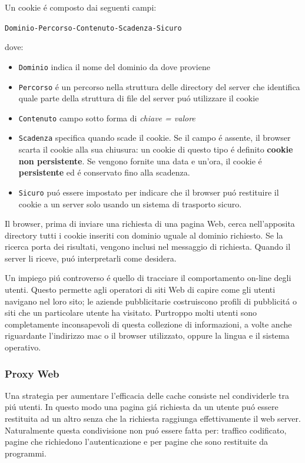 \documentclass[12pt]{article}
\def\code#1{\texttt{#1}}
\begin{document}
Un cookie \'e composto dai seguenti campi:
\begin{center}
	\code{Dominio-Percorso-Contenuto-Scadenza-Sicuro}
\end{center}
dove:
\begin{itemize}[noitemsep]
	\item \code{Dominio} indica il nome del dominio da dove proviene
	\item \code{Percorso} \'e un percorso nella struttura delle directory del server che identifica quale parte della struttura di 
		  file del server pu\'o utilizzare il cookie
	\item \code{Contenuto} campo sotto forma di \textit{chiave = valore}
	\item \code{Scadenza} specifica quando scade il cookie. Se il campo \'e assente, il browser scarta il cookie alla sua 
		  chiusura: un cookie di questo tipo \'e definito \textbf{cookie non persistente}. Se vengono fornite una data e un'ora, il 
		  cookie \'e \textbf{persistente} ed \'e conservato fino alla scadenza.
	\item \code{Sicuro} pu\'o essere impostato per indicare che il browser pu\'o restituire il cookie a un server solo usando un 
	      sistema di trasporto sicuro.
\end{itemize}
Il browser, prima di inviare una richiesta di una pagina Web, cerca nell'apposita directory tutti i cookie inseriti con dominio 
uguale al dominio richiesto. Se la ricerca porta dei risultati, vengono inclusi nel messaggio di richiesta. Quando il server li 
riceve, pu\'o interpretarli come desidera.

Un impiego pi\'u controverso \'e quello di tracciare il comportamento on-line degli utenti. Questo permette agli 
operatori di siti Web di capire come gli utenti navigano nel loro sito; le aziende pubblicitarie costruiscono profili di 
pubblicit\'a o siti che un particolare utente ha visitato. Purtroppo molti utenti sono completamente inconsapevoli di questa 
collezione di informazioni, a volte anche riguardante l'indirizzo mac o il browser utilizzato, oppure la lingua e il sistema 
operativo.

\subsubsection{Proxy Web}\label{web-http-http-proxy-web}
Una strategia per aumentare l'efficacia delle cache consiste nel condividerle tra pi\'u utenti. In questo modo una pagina gi\'a  
richiesta da un utente pu\'o essere restituita ad un altro senza che la richiesta raggiunga effettivamente il web server. 
Naturalmente questa condivisione non pu\'o essere fatta per: traffico codificato, pagine che richiedono l'autenticazione e per 
pagine che sono restituite da programmi.
\end{document}
